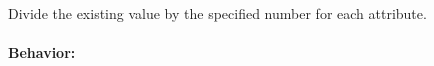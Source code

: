 Divide the existing value by the specified number for each attribute.

\paragraph{Behavior:}
\begin{itemize}[noitemsep]

\end{itemize}
